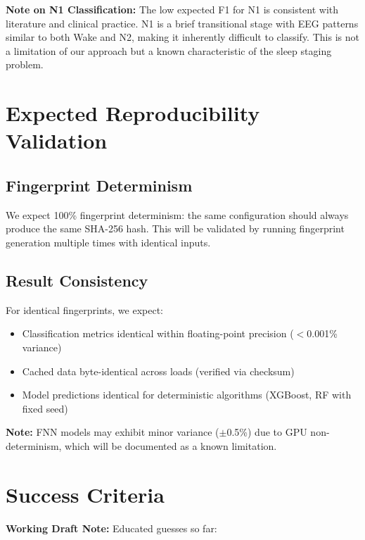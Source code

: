 \documentclass{imc-inf} %
\begin{document}
\textbf{Note on N1 Classification:} The low expected F1 for N1 is consistent with literature and clinical practice. N1 is a brief transitional stage with EEG patterns similar to both Wake and N2, making it inherently difficult to classify. This is not a limitation of our approach but a known characteristic of the sleep staging problem.

\section{Expected Reproducibility Validation}

\subsection{Fingerprint Determinism}

We expect 100\% fingerprint determinism: the same configuration should always produce the same SHA-256 hash. This will be validated by running fingerprint generation multiple times with identical inputs.

\subsection{Result Consistency}

For identical fingerprints, we expect:
\begin{itemize}
\item Classification metrics identical within floating-point precision ($<$0.001\% variance)
\item Cached data byte-identical across loads (verified via checksum)
\item Model predictions identical for deterministic algorithms (XGBoost, RF with fixed seed)
\end{itemize}

\textbf{Note:} FNN models may exhibit minor variance ($\pm$0.5\%) due to GPU non-determinism, which will be documented as a known limitation.

\section{Success Criteria}




\begin{center}
\colorbox{yellow!20}{%
\begin{minipage}{0.9\textwidth}
\textbf{Working Draft Note:} 
Educated guesses so far:
\end{minipage}
}
\end{center}
\end{document}
